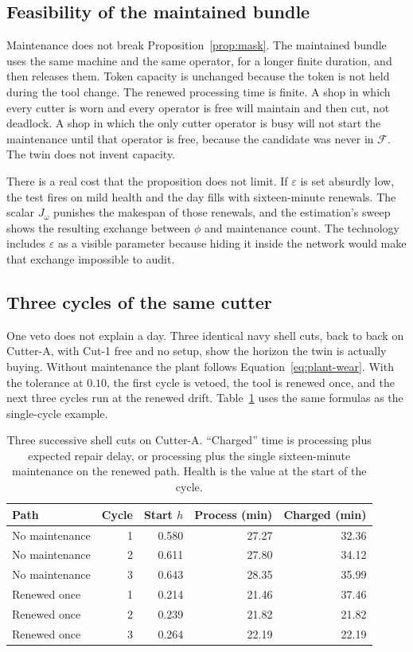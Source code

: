 \subsection{Feasibility of the maintained bundle}

Maintenance does not break Proposition~\ref{prop:mask}. The maintained bundle uses the same machine and the same operator, for a longer finite duration, and then releases them. Token capacity is unchanged because the token is not held during the tool change. The renewed processing time is finite. A shop in which every cutter is worn and every operator is free will maintain and then cut, not deadlock. A shop in which the only cutter operator is busy will not start the maintenance until that operator is free, because the candidate was never in \(\mathcal{F}\). The twin does not invent capacity.

There is a real cost that the proposition does not limit. If \(\varepsilon\) is set absurdly low, the test fires on mild health and the day fills with sixteen-minute renewals. The scalar \(J_\omega\) punishes the makespan of those renewals, and the estimation's sweep shows the resulting exchange between \(\phi\) and maintenance count. The technology includes \(\varepsilon\) as a visible parameter because hiding it inside the network would make that exchange impossible to audit.

\subsection{Three cycles of the same cutter}

One veto does not explain a day. Three identical navy shell cuts, back to back on Cutter-A, with Cut-1 free and no setup, show the horizon the twin is actually buying. Without maintenance the plant follows Equation~\eqref{eq:plant-wear}. With the tolerance at \(0.10\), the first cycle is vetoed, the tool is renewed once, and the next three cycles run at the renewed drift. Table~\ref{tab:threecycle} uses the same formulas as the single-cycle example.

\begin{table}[ht]
\centering
\caption{Three successive shell cuts on Cutter-A. ``Charged'' time is processing plus expected repair delay, or processing plus the single sixteen-minute maintenance on the renewed path. Health is the value at the start of the cycle.}
\label{tab:threecycle}
\small
\begin{tabular}{lrrrr}
\toprule
Path & Cycle & Start \(h\) & Process (min) & Charged (min) \\
\midrule
No maintenance & 1 & 0.580 & 27.27 & 32.36 \\
No maintenance & 2 & 0.611 & 27.80 & 34.12 \\
No maintenance & 3 & 0.643 & 28.35 & 35.99 \\
Renewed once & 1 & 0.214 & 21.46 & 37.46 \\
Renewed once & 2 & 0.239 & 21.82 & 21.82 \\
Renewed once & 3 & 0.264 & 22.19 & 22.19 \\
\bottomrule
\end{tabular}
\end{table}

